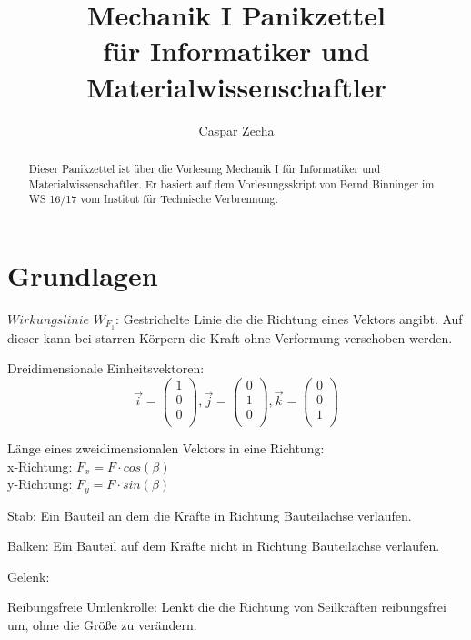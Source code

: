 \documentclass[a4paper,parskip=half*,DIV=7,fontsize=11pt]{scrartcl}
\title{Mechanik I Panikzettel \\ \Large für Informatiker und Materialwissenschaftler}
\author{Caspar Zecha}
\begin{document}
	
	\maketitle
	
	\begin{abstract}
		Dieser Panikzettel ist über die Vorlesung Mechanik I für Informatiker und Materialwissenschaftler. Er basiert auf dem Vorlesungsskript von Bernd Binninger im WS 16/17 vom Institut für Technische Verbrennung.
	\end{abstract}
	
	\tableofcontents
	
	\pagebreak
	
	\section{Grundlagen}
	$\textit{Wirkungslinie}$ $W_{F_1}$: Gestrichelte Linie die die Richtung eines Vektors angibt. Auf dieser kann bei starren Körpern die Kraft ohne Verformung verschoben werden.
	
	Dreidimensionale Einheitsvektoren: $$\overrightarrow{i}=\begin{pmatrix}
	1\\
	0\\
	0\\
	\end{pmatrix},\overrightarrow{j}=\begin{pmatrix}
	0\\
	1\\
	0\\
	\end{pmatrix},\overrightarrow{k}=\begin{pmatrix}
	0\\
	0\\
	1\\
	\end{pmatrix}$$
	
	Länge eines zweidimensionalen Vektors in eine Richtung:\\
	x-Richtung: $F_x=F \cdot cos(\beta)$\\
	y-Richtung: $F_y=F \cdot sin(\beta)$
	
	Stab: Ein Bauteil an dem die Kräfte in Richtung Bauteilachse verlaufen.
	
	Balken: Ein Bauteil auf dem Kräfte nicht in Richtung Bauteilachse verlaufen.
	
	Gelenk:
	
	Reibungsfreie Umlenkrolle: Lenkt die die Richtung von Seilkräften reibungsfrei um, ohne die Größe zu verändern.
	
\end{document}
